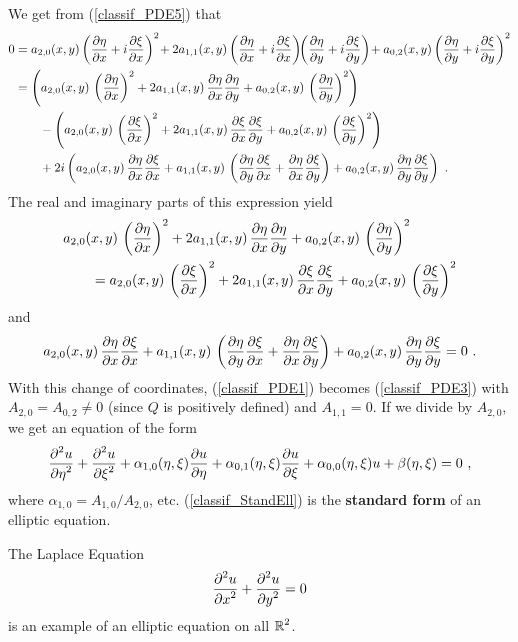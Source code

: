 We get from (\ref{classif_PDE5}) that
\begin{align*}
0 &= a_{2,0}(x,y) \left(\frac{\partial{\eta}}{\partial x}+i\frac{\partial{\xi}}{\partial x}\right)^2 \! +
2 a_{1,1}(x,y) \left(\frac{\partial{\eta}}{\partial x}+i\frac{\partial{\xi}}{\partial x}\right)
\!\! \left(\frac{\partial{\eta}}{\partial y}+i\frac{\partial{\xi}}{\partial y}\right) \!
+ a_{0,2}(x,y)\left(\frac{\partial{\eta}}{\partial y}+i\frac{\partial{\xi}}{\partial y}\right)^2 \\
&= \left( a_{2,0}(x,y)\,\left(\frac{\partial{\eta}}{\partial x}\right)^2
+ 2a_{1,1}(x,y)\, \frac{\partial{\eta}}{\partial x}\frac{\partial{\eta}}{\partial y}
+ a_{0,2}(x,y)\, \left(\frac{\partial{\eta}}{\partial y}\right)^2 \right) \\
&\qquad - \left( a_{2,0}(x,y)\,\left(\frac{\partial{\xi}}{\partial x}\right)^2
+ 2a_{1,1}(x,y)\, \frac{\partial{\xi}}{\partial x}\frac{\partial{\xi}}{\partial y}
+ a_{0,2}(x,y)\, \left(\frac{\partial{\xi}}{\partial y}\right)^2 \right) \\
&\qquad + 2i\left( a_{2,0}(x,y)\,\frac{\partial{\eta}}{\partial x}\frac{\partial{\xi}}{\partial x}
+ a_{1,1}(x,y)\, \left( \frac{\partial{\eta}}{\partial y}\frac{\partial{\xi}}{\partial x}
+\frac{\partial{\eta}}{\partial x}\frac{\partial{\xi}}{\partial y}\right)
+a_{0,2}(x,y)\,\frac{\partial{\eta}}{\partial y}\frac{\partial{\xi}}{\partial y}\right) \ .
\end{align*}
The real and imaginary parts of this expression yield
\begin{align*}
& a_{2,0}(x,y)\,\left(\frac{\partial{\eta}}{\partial x}\right)^2
+ 2a_{1,1}(x,y)\, \frac{\partial{\eta}}{\partial x}\frac{\partial{\eta}}{\partial y}
+ a_{0,2}(x,y)\, \left(\frac{\partial{\eta}}{\partial y}\right)^2 \\
& \qquad = a_{2,0}(x,y)\,\left(\frac{\partial{\xi}}{\partial x}\right)^2
+ 2a_{1,1}(x,y)\, \frac{\partial{\xi}}{\partial x}\frac{\partial{\xi}}{\partial y}
+ a_{0,2}(x,y)\, \left(\frac{\partial{\xi}}{\partial y}\right)^2
\end{align*}
and
\[
a_{2,0}(x,y)\,\frac{\partial{\eta}}{\partial x}\frac{\partial{\xi}}{\partial x}
+ a_{1,1}(x,y)\, \left( \frac{\partial{\eta}}{\partial y}\frac{\partial{\xi}}{\partial x}
+\frac{\partial{\eta}}{\partial x}\frac{\partial{\xi}}{\partial y}\right)
+a_{0,2}(x,y)\,\frac{\partial{\eta}}{\partial y}\frac{\partial{\xi}}{\partial y} = 0 \ .
\]
With this change of coordinates, (\ref{classif_PDE1}) becomes
(\ref{classif_PDE3}) with $A_{2,0} = A_{0,2} \neq 0$ (since $Q$ is
positively defined) and $A_{1,1} = 0$.  If we divide by $A_{2,0}$, we
get an equation of the form
\begin{equation} \label{classif_StandEll}
\frac{\displaystyle \partial^{2}{u}} {\displaystyle \partial \eta^{2}} + \frac{\displaystyle \partial^{2}{u}} {\displaystyle \partial \xi^{2}}
+ \alpha_{1,0}(\eta,\xi) \frac{\partial{u}}{\partial \eta}
+ \alpha_{0,1}(\eta,\xi) \frac{\partial{u}}{\partial \xi} + \alpha_{0,0}(\eta,\xi)u +
\beta (\eta,\xi) = 0 \ , 
\end{equation}
where $\displaystyle \alpha_{1,0} = A_{1,0}/A_{2,0}$, etc.
(\ref{classif_StandEll}) is the
{\bfseries standard form} of an elliptic equation.

\begin{egg}
The Laplace Equation
\[
\frac{\displaystyle \partial^{2}{u}} {\displaystyle \partial x^{2}} + \frac{\displaystyle \partial^{2}{u}} {\displaystyle \partial y^{2}} = 0
\]
is an example of an elliptic equation on all $\displaystyle \mathbb{R}^2$.
\end{egg}


